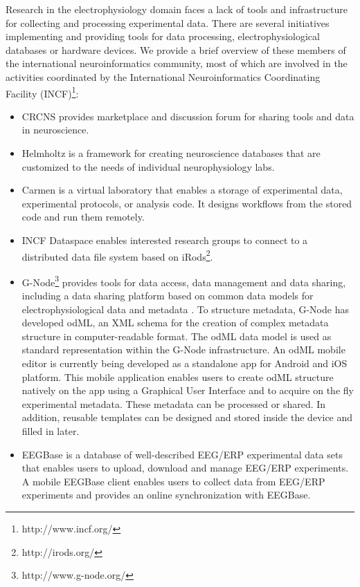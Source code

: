 \documentclass[a4paper,twoside]{article}
\begin{document}
Research in the electrophysiology domain faces a lack of tools and infrastructure for collecting and processing experimental data. There are several initiatives implementing and providing tools for data processing, electrophysiological databases or hardware devices. We provide a brief overview of these members of the international neuroinformatics community, most of which are involved in the activities coordinated by the International Neuroinformatics Coordinating Facility (INCF)\footnote{http://www.incf.org/}:

\begin{itemize}

\item	CRCNS \cite{CRCNS} provides marketplace and discussion forum for sharing tools and data in neuroscience.
\item	Helmholtz \cite{10.3389/conf.fninf.2013.09.00025} is a framework for creating neuroscience databases that are customized to the needs of individual neurophysiology labs.
\item	Carmen \cite{fgibson:Watson2007} is a virtual laboratory that enables a storage of experimental data, experimental protocols, or analysis code. It designs workflows from the stored code and run them remotely.
\item	INCF Dataspace \cite{dataspace} enables interested research groups to connect to a distributed data file system based on iRods\footnote{http://irods.org/}.
\item	G-Node\footnote{http://www.g-node.org/} provides tools for data access, data management and data sharing, including a data sharing platform \cite{Sobolev:2014} based on common data models for electrophysiological data and metadata \cite{Garcia:2014,10.3389/fninf.2011.00016}. To structure metadata, G-Node has developed odML, an XML schema for the creation of complex metadata structure in computer-readable format\cite{10.3389/fninf.2011.00016}. The odML data model is used as standard representation within the G-Node infrastructure. An odML mobile editor \cite{10.3389/conf.fninf.2014.18.00053} is currently being developed as a standalone app for Android and iOS platform. This mobile application enables users to create odML structure natively on the app using a Graphical User Interface and to acquire on the fly experimental metadata. These metadata can be processed or shared. In addition, reusable templates can be designed and stored inside the device and filled in later.
\item	EEGBase \cite{ISI:000306821100004} is a database of well-described EEG/ERP experimental data sets that enables users to upload, download and manage EEG/ERP experiments. A mobile EEGBase client \cite{10.3389/conf.fninf.2013.09.00046} enables users to collect data from EEG/ERP experiments and provides an online synchronization with EEGBase.



\end{itemize}
\end{document}
